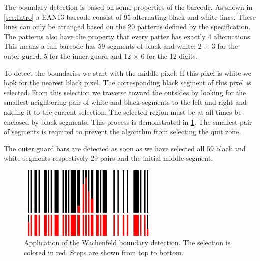 The boundary detection is based on some properties of the barcode. As shown in \cref{sec:Intro} a EAN13 barcode consist of 95 alternating black and white lines. These lines can only be arranged based on the 20 patterns defined by the specification. The patterns also have the property that every patter has exactly 4 alternations. This means a full barcode has 59 segments of black and white: 2 $\times$ 3 for the outer guard, 5 for the inner guard and 12 $\times$ 6 for the 12 digits.

To detect the boundaries we start with the middle pixel. If this pixel is white we look for the nearest black pixel. The corresponding black segment of this pixel is selected. From this selection we traverse toward the outsides by looking for the smallest neighboring pair of white and black segments to the left and right and adding it to the current selection. The selected region must be at all times be enclosed by black segments. This process is demonstrated in \cref{wachenfeld}. The smallest pair of segments is required to prevent the algorithm from selecting the quit zone.

The outer guard bars are detected as soon as we have selected all 59 black and white segments respectively 29 pairs and the initial middle segment.

\begin{figure}[t]
\center
\includegraphics[width=0.6\textwidth,natwidth=900,natheight=463]{img/wachenfeld.png}
\caption{Application of the Wachenfeld boundary detection. The selection is colored in red. Steps are shown from top to bottom.}
\label{wachenfeld}
\end{figure}


